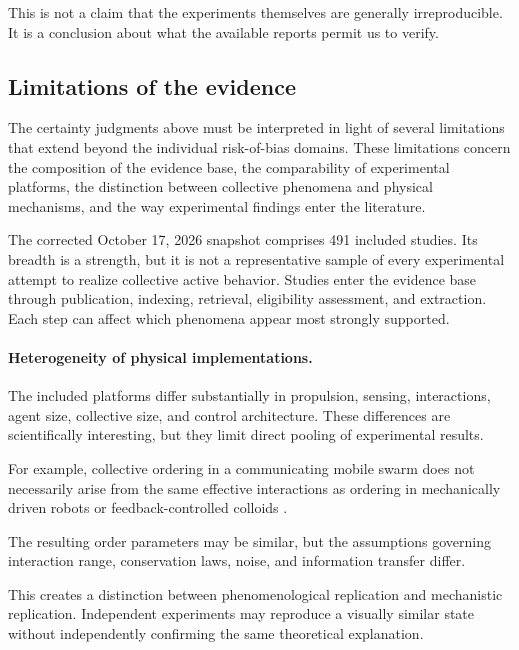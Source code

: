 This is not a
claim that the
experiments themselves
are generally
irreproducible.
It is a conclusion
about what the
available reports
permit us to verify.


\subsection{Limitations of the evidence}
\label{sec:discussion-evidence-limitations}

The certainty judgments above must be interpreted in light
of several limitations that extend beyond the individual
risk-of-bias domains. These limitations concern the
composition of the evidence base, the comparability
of experimental platforms, the distinction between
collective phenomena and physical mechanisms, and
the way experimental findings enter the literature.

The corrected October 17, 2026 snapshot comprises
491 included studies. Its breadth is a strength,
but it is not a representative sample of every
experimental attempt to realize collective
active behavior. Studies enter the evidence base
through publication, indexing, retrieval,
eligibility assessment, and extraction.
Each step can affect which phenomena
appear most strongly supported.

\paragraph*{Heterogeneity of physical implementations.}

The included platforms differ substantially in
propulsion, sensing, interactions, agent size,
collective size, and control architecture.
These differences are scientifically
interesting, but they limit direct pooling
of experimental results.

For example, collective ordering in a
communicating mobile swarm
\cite{Turgut2008selforganizedflocka,Vsrhelyi2018optimizedflockingo,Zhou2024anticipationpromote}
does not necessarily arise from the same
effective interactions as ordering
in mechanically driven robots
\cite{Welch2019activereorientation,Baconnier2022selectiveandcollec,Luo2025flockingphasesepar}
or feedback-controlled colloids
\cite{Buerle2020formationofstable,Chen2024synchronousandfull,Chen2024persistentandrespo}.

The resulting order parameters may be
similar, but the assumptions governing
interaction range, conservation laws,
noise, and information transfer differ.

This creates a distinction between
phenomenological replication and
mechanistic replication.
Independent experiments may reproduce
a visually similar state without
independently confirming the same
theoretical explanation.

